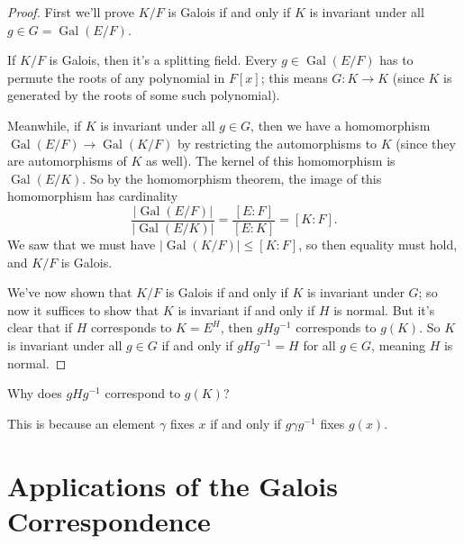 \begin{proof}
    First we'll prove $K/F$ is Galois if and only if $K$ is invariant under all $g \in G = \operatorname{Gal}(E/F)$. 
    
    If $K/F$ is Galois, then it's a splitting field. Every $g \in \operatorname{Gal}(E/F)$ has to permute the roots of any polynomial in $F[x]$; this means $G : K \to K$ (since $K$ is generated by the roots of some such polynomial). 

    Meanwhile, if $K$ is invariant under all $g \in G$, then we have a homomorphism $\operatorname{Gal}(E/F) \to \operatorname{Gal}(K/F)$ by restricting the automorphisms to $K$ (since they are automorphisms of $K$ as well). The kernel of this homomorphism is $\operatorname{Gal}(E/K)$. So by the homomorphism theorem, the image of this homomorphism has cardinality \[\frac{\lvert\operatorname{Gal}(E/F)\rvert}{\lvert\operatorname{Gal}(E/K)\rvert} = \frac{[E : F]}{[E : K]} = [K : F].\] We saw that we must have $\lvert \operatorname{Gal}(K/F)\rvert \leq [K : F]$, so then equality must hold, and $K/F$ is Galois. 
    
    We've now shown that $K/F$ is Galois if and only if $K$ is invariant under $G$; so now it suffices to show that $K$ is invariant if and only if $H$ is normal. But it's clear that if $H$ corresponds to $K = E^H$, then $gHg^{-1}$ corresponds to $g(K)$. So $K$ is invariant under all $g \in G$ if and only if $gHg^{-1} = H$ for all $g \in G$, meaning $H$ is normal. 
\end{proof}

\begin{question}
Why does $gHg^{-1}$ correspond to $g(K)$?
\end{question}

\begin{ans}
This is because an element $\gamma$ fixes $x$ if and only if $g\gamma g^{-1}$ fixes $g(x)$. 
\end{ans}





\section{Applications of the Galois Correspondence}

